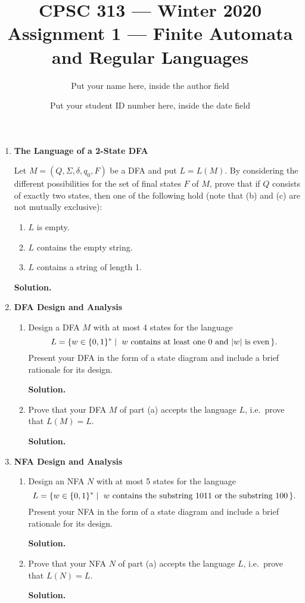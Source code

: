 \documentclass[11pt, letterpaper]{article}
\begin{document}
\title{CPSC 313 --- Winter 2020 \\ [3pt]
     Assignment 1 ---   Finite Automata and Regular Languages}	
\date{}
\author{Put your name here, inside the author field}
\date{Put your student ID number here, inside the date field}

\maketitle


\begin{enumerate}
\item \textbf{The Language of a 2-State DFA}

Let $M = (Q, \Sigma, \delta, q_0, F)$ be a DFA and put $L = L(M)$. By considering the different
    possibilities for the set of final states $F$ of $M$, prove that if $Q$ consists of exactly
    two states, then one of the following hold (note that (b) and (c) are not mutually
    exclusive):
    \begin{enumerate}
        \item $L$ is empty.
        \item $L$ contains the empty string.
        \item $L$ contains a string of length 1.
    \end{enumerate}

\textbf{Solution.}

\newpage

\item \textbf{DFA Design and Analysis}
\begin{enumerate}
\item Design a DFA $M$ with at most 4 states for the language
%
\[ L = \{ w \in \{ 0, 1 \}^* \mid \text{ $w$ contains at least one 0 and $|w|$ is even\,} \}. \]
%
Present your DFA in the form of a state diagram and include a brief rationale for its
design.


\textbf{Solution.}

\newpage

\item Prove that your DFA $M$ of part (a) accepts the language $L$, i.e.\ prove that $L(M)
    = L$.

\textbf{Solution.}

\end{enumerate}

\newpage

\item \textbf{NFA Design and Analysis}
\begin{enumerate}
\item Design an NFA $N$ with at most 5 states for the language
%
\[ L = \{ w \in \{ 0, 1 \}^* \mid \text{ $w$ contains the substring $1011$ or the substring $100$\,} \}. \]
%
Present your NFA in the form of a state diagram and include a brief rationale for its
design.

\textbf{Solution.}

\newpage

\item Prove that your NFA $N$ of part (a) accepts the language $L$, i.e.\ prove that $L(N)
    = L$.

\textbf{Solution.}

\end{enumerate}
\end{enumerate}
\end{document}
